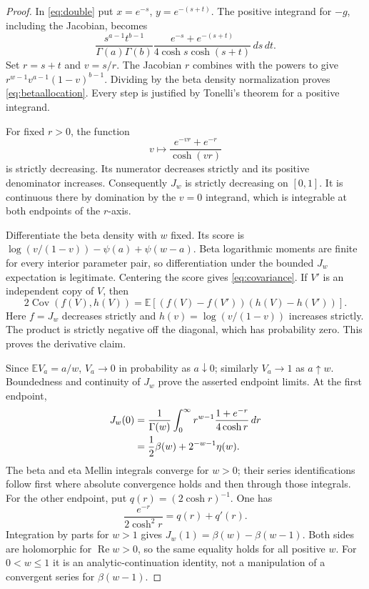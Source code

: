 \documentclass[11pt,a4paper]{article}
\numberwithin{equation}{section}
\theoremstyle{definition}
\theoremstyle{remark}
\renewcommand{\Re}{\operatorname{Re}}
\begin{document}
\begin{proof}
In \eqref{eq:double} put $x=e^{-s}$, $y=e^{-(s+t)}$. The positive
integrand for $-g$, including the Jacobian, becomes
\[
 \frac{s^{a-1}t^{b-1}}{\Gamma(a)\Gamma(b)}
 \frac{e^{-s}+e^{-(s+t)}}{4\cosh s\cosh(s+t)}\,ds\,dt.
\]
Set $r=s+t$ and $v=s/r$. The Jacobian $r$ combines with the powers
to give $r^{w-1}v^{a-1}(1-v)^{b-1}$. Dividing by the beta density
normalization proves \eqref{eq:betaallocation}. Every step is justified
by Tonelli's theorem for a positive integrand.

For fixed $r>0$, the function
\[
 v\longmapsto\frac{e^{-vr}+e^{-r}}{\cosh(vr)}
\]
is strictly decreasing. Its numerator decreases strictly and its
positive denominator increases. Consequently $J_w$ is strictly
decreasing on $[0,1]$. It is continuous there by domination by the
$v=0$ integrand, which is integrable at both endpoints of the $r$-axis.

Differentiate the beta density with $w$ fixed. Its score is
$\log(v/(1-v))-\psi(a)+\psi(w-a)$. Beta logarithmic moments are finite
for every interior parameter pair, so differentiation under the
bounded $J_w$ expectation is legitimate. Centering the score gives
\eqref{eq:covariance}. If $V'$ is an independent copy of $V$, then
\[
 2\operatorname{Cov}(f(V),h(V))
 =\mathbb E[(f(V)-f(V'))(h(V)-h(V'))].
\]
Here $f=J_w$ decreases strictly and $h(v)=\log(v/(1-v))$ increases
strictly. The product is strictly negative off the diagonal, which has
probability zero. This proves the derivative claim.

Since $\mathbb E V_a=a/w$, $V_a\to0$ in probability as $a\downarrow0$;
similarly $V_a\to1$ as $a\uparrow w$. Boundedness and continuity of
$J_w$ prove the asserted endpoint limits. At the first endpoint,
\begin{align}
 J_w(0)
 &=\frac1{\Gamma(w)}\int_0^\infty
 r^{w-1}\frac{1+e^{-r}}{4\cosh r}\,dr\notag\\
 &=\frac12\beta(w)+2^{-w-1}\eta(w).\label{eq:J0}
\end{align}
The beta and eta Mellin integrals converge for $w>0$; their series
identifications follow first where absolute convergence holds and then
through those integrals. For the other endpoint, put
$q(r)=(2\cosh r)^{-1}$. One has
\[
 \frac{e^{-r}}{2\cosh^2r}=q(r)+q'(r).
\]
Integration by parts for $w>1$ gives
$J_w(1)=\beta(w)-\beta(w-1)$. Both sides are holomorphic for
$\Re w>0$, so the same equality holds for all positive $w$.
For $0<w\le1$ it is an analytic-continuation identity, not a manipulation
of a convergent series for $\beta(w-1)$.
\end{proof}
\end{document}
